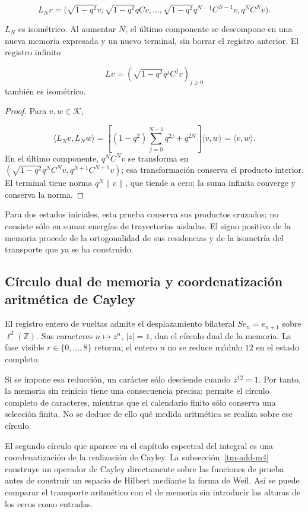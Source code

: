 \[
L_Nv=\bigl(\sqrt{1-q^2}v,
\sqrt{1-q^2}qCv,\ldots,
\sqrt{1-q^2}q^{N-1}C^{N-1}v, q^NC^Nv\bigr).
\]
\begin{proposition}
\label{tm-add-proposicion-costura-2}
\(L_N\) es isométrico. Al aumentar \(N\), el último componente se descompone en una nueva memoria expresada y un nuevo terminal, sin borrar el registro anterior. El registro infinito

\[
Lv=\left(\sqrt{1-q^2}q^jC^jv\right)_{j\geq0}
\]
también es isométrico.
\end{proposition}

\begin{proof}
Para \(v,w\in\mathcal K\),

\[
\langle L_Nv,L_Nw\rangle
=\left[(1-q^2)\sum_{j=0}^{N-1}q^{2j}+q^{2N}\right]
\langle v,w\rangle=\langle v,w\rangle.
\]
En el último componente, \(q^NC^Nv\) se transforma en \((\sqrt{1-q^2}q^NC^Nv,q^{N+1}C^{N+1}v)\); esa transformación conserva el producto interior. El terminal tiene norma \(q^N\|v\|\), que tiende a cero; la suma infinita converge y conserva la norma.
\end{proof}

Para dos estados iniciales, esta prueba conserva sus productos cruzados; no consiste sólo en sumar energías de trayectorias aisladas. El signo positivo de la memoria procede de la ortogonalidad de sus residencias y de la isometría del transporte que ya se ha construido.


\subsection{Círculo dual de memoria y coordenatización aritmética de Cayley}
\label{tm-add-c4}
El registro entero de vueltas admite el desplazamiento bilateral \(Se_n=e_{n+1}\) sobre \(\ell^2(\mathbb Z)\). Sus caracteres \(n\mapsto z^n\), \(|z|=1\), dan el círculo dual de la memoria. La fase visible \(r\in\{0,\ldots,8\}\) retorna; el entero \(n\) no se reduce módulo \(12\) en el estado completo.

Si se impone esa reducción, un carácter sólo desciende cuando \(z^{12}=1\). Por tanto, la memoria sin reinicio tiene una consecuencia precisa: permite el círculo completo de caracteres, mientras que el calendario finito sólo conserva una selección finita. No se deduce de ello qué medida aritmética se realiza sobre ese círculo.

El segundo círculo que aparece en el capítulo espectral del integral es una coordenatización de la realización de Cayley. La subsección~\ref{tm-add-m4} construye un operador de Cayley directamente sobre las funciones de prueba antes de construir un espacio de Hilbert mediante la forma de Weil. Así se puede comparar el transporte aritmético con el de memoria sin introducir las alturas de los ceros como entradas.


